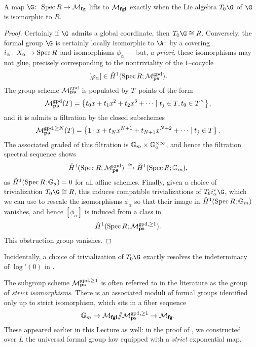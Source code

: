 \begin{lemma}\label{CoordinatizbleFGs}
A map $\G\co \Spec R \to \moduli{fg}$ lifts to $\mathcal{M}_{\mathbf{fgl}}$ exactly when the Lie algebra $T_0 \G$ of $\G$ is isomorphic to $R$.
\end{lemma}
\begin{proof}
Certainly if $\G$ admits a global coordinate, then $T_0 \G \cong R$.  Conversely, the formal group $\G$ is certainly locally isomorphic to $\A^1$ by a covering $i_\alpha\colon\thinspace X_\alpha \to \operatorname{Spec} R$ and isomorphisms $\phi_\alpha$ --- but, \textit{a priori}, these isomorphisms may not glue, precisely corresponding to the nontriviality of the {\Cech} $1$--cocycle \[[\varphi_\alpha] \in \check{H}^1(\operatorname{Spec} R; \mathcal{M}_{\mathbf{ps}}^{\mathrm{gpd}}).\]  The group scheme $\mathcal{M}_{\mathbf{ps}}^{\mathrm{gpd}}$ is populated by $T$--points of the form \[\mathcal{M}_{\mathbf{ps}}^{\mathrm{gpd}}(T) = \left\{ t_0 x + t_1 x^2 + t_2 x^3 + \cdots \mid t_j \in T, t_0 \in T^\times \right\},\] and it is admits a filtration by the closed subschemes \[\mathcal{M}_{\mathbf{ps}}^{\mathrm{gpd}, \ge N}(T) = \left\{ 1 \cdot x + t_N x^{N+1} + t_{N+1} x^{N+2} + \cdots \mid t_j \in T \right\}.\]  The associated graded of this filtration is $\mathbb G_m \times \mathbb G_a^{\times \infty}$, and hence the filtration spectral sequence shows \[\check{H}^1(\operatorname{Spec} R; \mathcal{M}_{\mathbf{ps}}^{\mathrm{gpd}}) \xrightarrow{\simeq} \check{H}^1(\operatorname{Spec} R; \mathbb G_m),\] as $\check{H}^1(\operatorname{Spec} R; \mathbb G_a) = 0$ for all affine schemes.  Finally, given a choice of trivialization $T_0 \G \cong R$, this induces compatible trivializations of $T_0 i_\alpha^* \G$, which we can use to rescale the isomorphisms $\phi_\alpha$ so that their image in $\check{H}^1(\operatorname{Spec} R; \mathbb G_m)$ vanishes, and hence $[\phi_\alpha]$ is induced from a class in \[\check{H}^1(\operatorname{Spec} R; \mathcal{M}_{\mathbf{ps}}^{\mathrm{gpd}, \ge 1}).\]  This obstruction group vanishes.
\end{proof}

\begin{remark}
Incidentally, a choice of trivialization of $T_0 \G$ exactly resolves the indeterminacy of $\log'(0)$ in .
\end{remark}

\begin{remark}
The subgroup scheme $\mathcal{M}_{\mathbf{ps}}^{\mathrm{gpd}, \ge 1}$ is often referred to in the literature as the group of \textit{strict isomorphisms}.  There is an associated moduli of formal groups identified only up to strict isomorphism, which sits in a fiber sequence \[\mathbb G_m \to \mathcal{M}_{\mathbf{fgl}} /\!\!/ \mathcal{M}_{\mathbf{ps}}^{\mathrm{gpd}, \ge 1} \to \mathcal{M}_{\mathbf{fg}}.\]  These appeared earlier in this Lecture as well: in the proof of , we constructed over $L$ the universal formal group law equipped with a \emph{strict} exponential map.
\end{remark}











